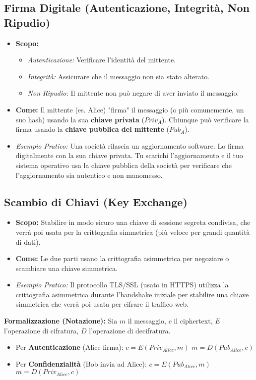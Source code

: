\documentclass{article}
\begin{document}
\subsection{Firma Digitale (Autenticazione, Integrità, Non Ripudio)}
\begin{itemize}
    \item \textbf{Scopo:}
    \begin{itemize}
        \item \textit{Autenticazione:} Verificare l'identità del mittente.
        \item \textit{Integrità:} Assicurare che il messaggio non sia stato alterato.
        \item \textit{Non Ripudio:} Il mittente non può negare di aver inviato il messaggio.
    \end{itemize}
    \item \textbf{Come:} Il mittente (es. Alice) "firma" il messaggio (o più comunemente, un suo hash) usando la sua \textbf{chiave privata} ($Priv_A$).
    Chiunque può verificare la firma usando la \textbf{chiave pubblica del mittente} ($Pub_A$).
    \item \textit{Esempio Pratico:} Una società rilascia un aggiornamento software. Lo firma digitalmente con la sua chiave privata. Tu scarichi l'aggiornamento e il tuo sistema operativo usa la chiave pubblica della società per verificare che l'aggiornamento sia autentico e non manomesso.
\end{itemize}

\subsection{Scambio di Chiavi (Key Exchange)}
\begin{itemize}
    \item \textbf{Scopo:} Stabilire in modo sicuro una chiave di sessione segreta condivisa, che verrà poi usata per la crittografia simmetrica (più veloce per grandi quantità di dati).
    \item \textbf{Come:} Le due parti usano la crittografia asimmetrica per negoziare o scambiare una chiave simmetrica.
    \item \textit{Esempio Pratico:} Il protocollo TLS/SSL (usato in HTTPS) utilizza la crittografia asimmetrica durante l'handshake iniziale per stabilire una chiave simmetrica che verrà poi usata per cifrare il traffico web.
\end{itemize}

\textbf{Formalizzazione (Notazione):}
Sia $m$ il messaggio, $c$ il ciphertext, $E$ l'operazione di cifratura, $D$ l'operazione di decifratura.
\begin{itemize}
    \item Per \textbf{Autenticazione} (Alice firma):
    $c = E(Priv_{Alice}, m)$
    $m = D(Pub_{Alice}, c)$
    \item Per \textbf{Confidenzialità} (Bob invia ad Alice):
    $c = E(Pub_{Alice}, m)$
    $m = D(Priv_{Alice}, c)$
\end{itemize}
\end{document}
